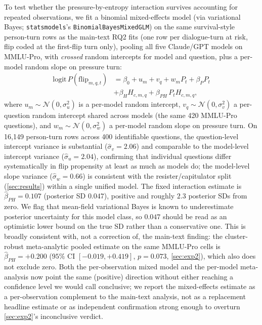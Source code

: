 To test whether the pressure-by-entropy interaction survives accounting for repeated observations, we fit a binomial mixed-effects model (via variational Bayes; \texttt{statsmodels}'s \texttt{BinomialBayesMixedGLM}) on the same survival-style person-turn rows as the main-text RQ2 fits (one row per dialogue-turn at risk, flip coded at the first-flip turn only), pooling all five Claude/GPT models on MMLU-Pro, with \emph{crossed} random intercepts for model and question, plus a per-model random slope on pressure turn:
\[
\begin{aligned}
\mathrm{logit}\,P(\mathrm{flip}_{m,q,t})
&= \beta_0 + u_m + v_q + w_m P_t + \beta_P P_t \\
&+ \beta_H H_{c,m,q} + \beta_{PH}\,P_t H_{c,m,q},
\end{aligned}
\]
where $u_m \sim \mathcal{N}(0, \sigma_u^2)$ is a per-model random intercept, $v_q \sim \mathcal{N}(0, \sigma_v^2)$ a per-question random intercept shared across models (the same 420 MMLU-Pro questions), and $w_m \sim \mathcal{N}(0, \sigma_w^2)$ a per-model random slope on pressure turn. On 16{,}149 person-turn rows across 400 identifiable questions, the question-level intercept variance is substantial ($\hat\sigma_v = 2.06$) and comparable to the model-level intercept variance ($\hat\sigma_u = 2.04$), confirming that individual questions differ systematically in flip propensity at least as much as models do; the model-level slope variance ($\hat\sigma_w = 0.66$) is consistent with the resister/capitulator split (\autoref{sec:results}) within a single unified model. The fixed interaction estimate is $\hat\beta_{PH} = 0.107$ (posterior SD $0.047$), positive and roughly $2.3$ posterior SDs from zero. We flag that mean-field variational Bayes is known to underestimate posterior uncertainty for this model class, so $0.047$ should be read as an optimistic lower bound on the true SD rather than a conservative one. This is broadly consistent with, not a correction of, the main-text finding: the cluster-robust meta-analytic pooled estimate on the same MMLU-Pro cells is $\hat\beta_{PH}=+0.200$ ($95\%$ CI $[-0.019,+0.419]$, $p=0.073$, \autoref{sec:exp2}), which also does not exclude zero. Both the per-observation mixed model and the per-model meta-analysis now point the same (positive) direction without either reaching a confidence level we would call conclusive; we report the mixed-effects estimate as a per-observation complement to the main-text analysis, not as a replacement headline estimate or as independent confirmation strong enough to overturn \autoref{sec:exp2}'s inconclusive verdict.

